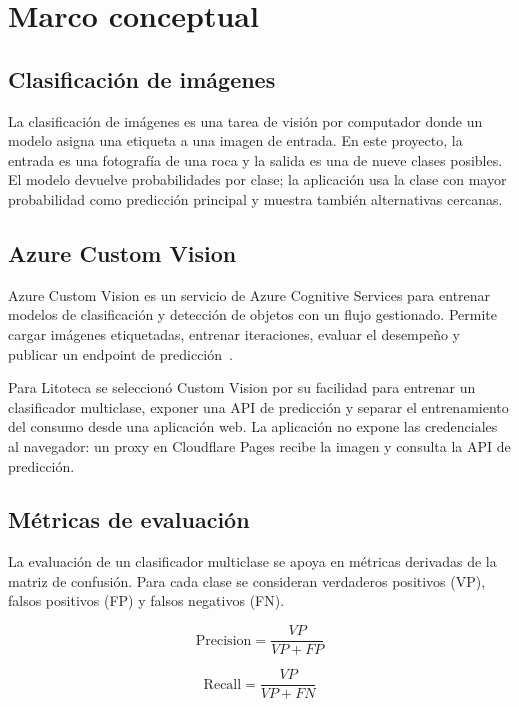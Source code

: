 \chapter{Marco conceptual}
\label{ch:background}

\section{Clasificación de imágenes}

La clasificación de imágenes es una tarea de visión por computador donde un modelo
asigna una etiqueta a una imagen de entrada. En este proyecto, la entrada es una
fotografía de una roca y la salida es una de nueve clases posibles. El modelo
devuelve probabilidades por clase; la aplicación usa la clase con mayor probabilidad
como predicción principal y muestra también alternativas cercanas.

\section{Azure Custom Vision}

Azure Custom Vision es un servicio de Azure Cognitive Services para entrenar
modelos de clasificación y detección de objetos con un flujo gestionado. Permite
cargar imágenes etiquetadas, entrenar iteraciones, evaluar el desempeño y publicar
un endpoint de predicción~\cite{azurecustomvision}.

Para Litoteca se seleccionó Custom Vision por su facilidad para entrenar un
clasificador multiclase, exponer una API de predicción y separar el entrenamiento
del consumo desde una aplicación web. La aplicación no expone las credenciales al
navegador: un proxy en Cloudflare Pages recibe la imagen y consulta la API de
predicción.

\section{Métricas de evaluación}

La evaluación de un clasificador multiclase se apoya en métricas derivadas de la
matriz de confusión. Para cada clase se consideran verdaderos positivos (VP),
falsos positivos (FP) y falsos negativos (FN).

\begin{equation}
  \mathrm{Precision} = \frac{VP}{VP + FP}
  \label{eq:precision}
\end{equation}

\begin{equation}
  \mathrm{Recall} = \frac{VP}{VP + FN}
  \label{eq:recall}
\end{equation}

